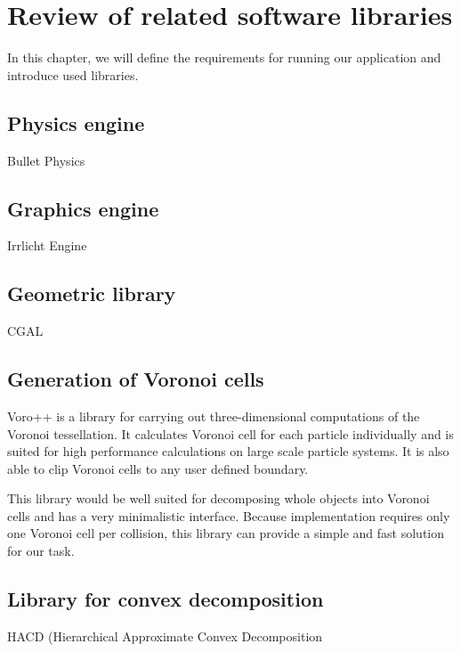 \chapter{Review of related software libraries}
\label{chapt:technology}
In this chapter, we will define the requirements for running our application and introduce used libraries.



\section{Physics engine}
Bullet Physics


\section{Graphics engine}
Irrlicht Engine

\section{Geometric library}
CGAL

\section{Generation of Voronoi cells}
Voro++ is a library for carrying out three-dimensional computations of the Voronoi tessellation. It calculates Voronoi cell for each particle individually and is suited for high performance calculations on large scale particle systems. It is also able to clip Voronoi cells to any user defined boundary.

This library would be well suited for decomposing whole objects into Voronoi cells and has a very minimalistic interface. Because implementation requires only one Voronoi cell per collision, this library can provide a simple and fast solution for our task.

\section{Library for convex decomposition}
\label{sec:decompositionLib}
HACD (Hierarchical Approximate Convex Decomposition
\cite{HACD}





